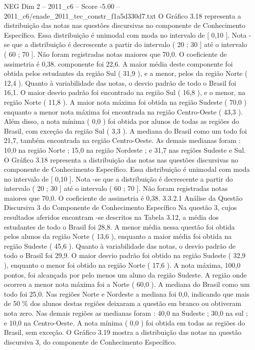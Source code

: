 \begin{textsample}{NEG Dim 2 – 2011\_c6 – Score -5.00 – 2011\_c6/enade\_2011\_tec\_constr\_f1a5d330d7.txt}
O Gráfico 3.18 representa a distribuição das notas nas questões discursivas no componente de Conhecimento Específico.
Essa distribuição é unimodal com moda no intervalo de [ 0,10 ].
Nota -se que a distribuição é decrescente a partir do intervalo ( 20 ; 30 ] até o intervalo ( 60 ; 70 ].
Não foram registradas notas maiores que 70,0.
O coeficiente de assimetria é 0,38. componente foi 22,6.
A maior média deste componente foi obtida pelos estudantes da região Sul ( 31,9 ), e a menor, pelos da região Norte ( 12,4 ).
Quanto à variabilidade das notas, o desvio padrão de todo o Brasil foi 16,1.
O maior desvio padrão foi encontrado na região Sul ( 16,8 ), e o menor, na região Norte ( 11,8 ).
A maior nota máxima foi obtida na região Sudeste ( 70,0 ) enquanto a menor nota máxima foi encontrada na região Centro-Oeste ( 43,3 ).
Além disso, a nota mínima ( 0,0 ) foi obtida por alunos de todas as regiões do Brasil, com exceção da região Sul ( 3,3 ).
A mediana do Brasil como um todo foi 21,7, também encontrada na região Centro-Oeste.
As demais medianas foram : 10,0 na região Norte ; 15,0 na região Nordeste ; e 31,7 nas regiões Sudeste e Sul.
O Gráfico 3.18 representa a distribuição das notas nas questões discursivas no componente de Conhecimento Específico.
Essa distribuição é unimodal com moda no intervalo de [ 0,10 ].
Nota -se que a distribuição é decrescente a partir do intervalo ( 20 ; 30 ] até o intervalo ( 60 ; 70 ].
Não foram registradas notas maiores que 70,0.
O coeficiente de assimetria é 0,38. 3.3.2.1 Análise da Questão Discursiva 3 do Componente de Conhecimento Específico Na questão 3, cujos resultados aferidos encontram -se descritos na Tabela 3.12, a média dos estudantes de todo o Brasil foi 28,8.
A menor média nessa questão foi obtida pelos alunos da região Norte ( 13,6 ), enquanto a maior média foi obtida na região Sudeste ( 45,6 ).
Quanto à variabilidade das notas, o desvio padrão de todo o Brasil foi 29,9.
O maior desvio padrão foi obtido na região Sudeste ( 32,9 ), enquanto o menor foi obtido na região Norte ( 17,6 ).
A nota máxima, 100,0 pontos, foi alcançada por pelo menos um aluno da região Sudeste.
A região onde ocorreu a menor nota máxima foi a Norte ( 60,0 ).
A mediana do Brasil como um todo foi 25,0.
Nas regiões Norte e Nordeste a mediana foi 0,0, indicando que mais de 50 \% dos alunos destas regiões deixaram a questão em branco ou obtiveram nota zero.
Nas demais regiões as medianas foram : 40,0 na Sudeste ; 30,0 na sul ; e 10,0 na Centro-Oeste.
A nota mínima ( 0,0 ) foi obtida em todas as regiões do Brasil, sem exceção.
O Gráfico 3.19 mostra a distribuição das notas na questão discursiva 3, do componente de Conhecimento Específico.

\end{textsample}
